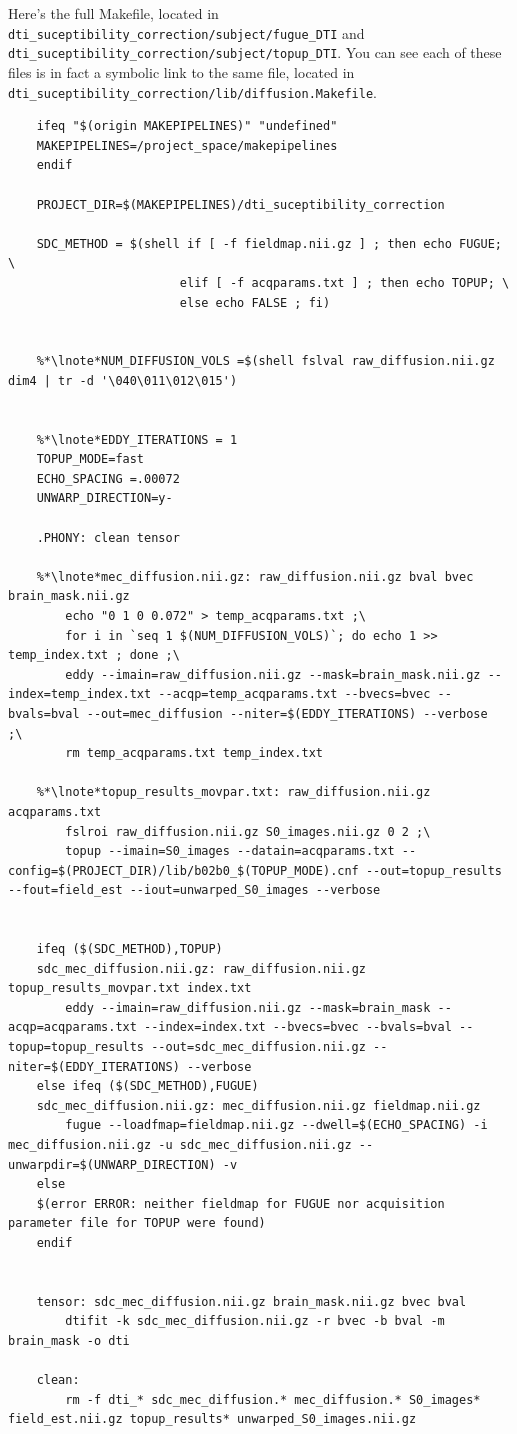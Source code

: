 Here's the full Makefile, located in
\texttt{dti_suceptibility_correction/subject/fugue_DTI} and
\texttt{dti_suceptibility_correction/subject/topup_DTI}. You can see
each of these files is in fact a symbolic link to the same file, located in
\texttt{dti_suceptibility_correction/lib/diffusion.Makefile}.

\setcounter{codehighlight}{0}
\begin{lstlisting}
	ifeq "$(origin MAKEPIPELINES)" "undefined"
	MAKEPIPELINES=/project_space/makepipelines
	endif

	PROJECT_DIR=$(MAKEPIPELINES)/dti_suceptibility_correction

	SDC_METHOD = $(shell if [ -f fieldmap.nii.gz ] ; then echo FUGUE; \
	                    elif [ -f acqparams.txt ] ; then echo TOPUP; \
	                    else echo FALSE ; fi)


	%*\lnote*NUM_DIFFUSION_VOLS =$(shell fslval raw_diffusion.nii.gz dim4 | tr -d '\040\011\012\015')


	%*\lnote*EDDY_ITERATIONS = 1
	TOPUP_MODE=fast
	ECHO_SPACING =.00072
	UNWARP_DIRECTION=y-

	.PHONY: clean tensor

	%*\lnote*mec_diffusion.nii.gz: raw_diffusion.nii.gz bval bvec brain_mask.nii.gz
		echo "0 1 0 0.072" > temp_acqparams.txt ;\
		for i in `seq 1 $(NUM_DIFFUSION_VOLS)`; do echo 1 >> temp_index.txt ; done ;\
		eddy --imain=raw_diffusion.nii.gz --mask=brain_mask.nii.gz --index=temp_index.txt --acqp=temp_acqparams.txt --bvecs=bvec --bvals=bval --out=mec_diffusion --niter=$(EDDY_ITERATIONS) --verbose  ;\
		rm temp_acqparams.txt temp_index.txt

	%*\lnote*topup_results_movpar.txt: raw_diffusion.nii.gz acqparams.txt
		fslroi raw_diffusion.nii.gz S0_images.nii.gz 0 2 ;\
		topup --imain=S0_images --datain=acqparams.txt --config=$(PROJECT_DIR)/lib/b02b0_$(TOPUP_MODE).cnf --out=topup_results --fout=field_est --iout=unwarped_S0_images --verbose


	ifeq ($(SDC_METHOD),TOPUP)
	sdc_mec_diffusion.nii.gz: raw_diffusion.nii.gz topup_results_movpar.txt index.txt
		eddy --imain=raw_diffusion.nii.gz --mask=brain_mask --acqp=acqparams.txt --index=index.txt --bvecs=bvec --bvals=bval --topup=topup_results --out=sdc_mec_diffusion.nii.gz --niter=$(EDDY_ITERATIONS) --verbose
	else ifeq ($(SDC_METHOD),FUGUE)
	sdc_mec_diffusion.nii.gz: mec_diffusion.nii.gz fieldmap.nii.gz
		fugue --loadfmap=fieldmap.nii.gz --dwell=$(ECHO_SPACING) -i mec_diffusion.nii.gz -u sdc_mec_diffusion.nii.gz --unwarpdir=$(UNWARP_DIRECTION) -v
	else
	$(error ERROR: neither fieldmap for FUGUE nor acquisition parameter file for TOPUP were found)
	endif


	tensor: sdc_mec_diffusion.nii.gz brain_mask.nii.gz bvec bval
		dtifit -k sdc_mec_diffusion.nii.gz -r bvec -b bval -m brain_mask -o dti

	clean:
		rm -f dti_* sdc_mec_diffusion.* mec_diffusion.* S0_images* field_est.nii.gz topup_results* unwarped_S0_images.nii.gz

\end{lstlisting}


